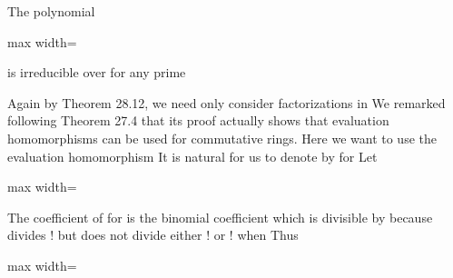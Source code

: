 \documentclass[11pt,oneside]{article}
\begin{document}
\begin{BookBody}

 The polynomial

\begin{center}\begin{adjustbox}{max width=\linewidth}\end{adjustbox}\end{center}

\noindent is irreducible over  for any prime 

 Again by Theorem 28.12, we need only consider factorizations in  We remarked following Theorem 27.4 that its proof actually shows that evaluation homomorphisms can be used for commutative rings. Here we want to use the evaluation homomorphism  It is natural for us to denote  by  for  Let

\begin{center}\begin{adjustbox}{max width=\linewidth}\end{adjustbox}\end{center}

\noindent The coefficient of  for  is the binomial coefficient  which is divisible by  because  divides ! but does not divide either ! or ! when  Thus

\begin{center}\begin{adjustbox}{max width=\linewidth}\end{adjustbox}\end{center}


\end{BookBody}
\end{document}
